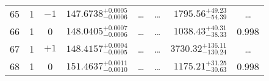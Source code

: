 \begin{table*}[!]
\begin{tabular}{llcrrlrc}
65 & 1 & $-1$ & $    147.6738_{-      0.0006}^{+      0.0005}$ & \multicolumn{1}{c}{\dots} & \multicolumn{1}{c}{\dots} & $     1795.56_{-       54.39}^{+       49.23}$ & \dots \\[1pt]
66 & 1 & 0 & $    148.0405_{-      0.0006}^{+      0.0007}$ & \multicolumn{1}{c}{\dots} & \multicolumn{1}{c}{\dots} & $     1038.43_{-       38.33}^{+       40.31}$ & 0.998\\[1pt]
67 & 1 & $+1$ & $    148.4157_{-      0.0005}^{+      0.0004}$ & \multicolumn{1}{c}{\dots} & \multicolumn{1}{c}{\dots} & $     3730.32_{-      130.24}^{+      136.11}$ & \dots \\[1pt]
68 & 1 & 0 & $    151.4637_{-      0.0010}^{+      0.0011}$ & \multicolumn{1}{c}{\dots} & \multicolumn{1}{c}{\dots} & $     1175.21_{-       30.63}^{+       31.25}$ & 0.998\\[1pt]


\end{tabular}
\end{table*}
